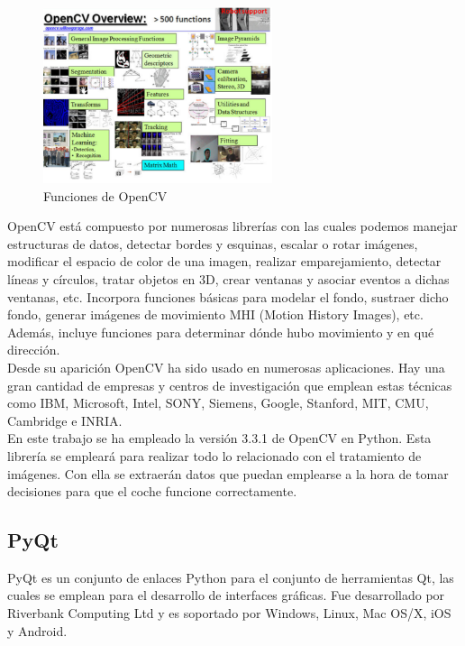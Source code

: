 \begin{figure}[H]
  \begin{center}
    \includegraphics[width=0.6\textwidth]{figures/Estado_arte/opencv.png}
		\caption{Funciones de OpenCV}
		\label{fig.opencv}
		\end{center}
\end{figure}

OpenCV está compuesto por numerosas librerías con las cuales podemos manejar estructuras de datos, detectar bordes y esquinas, escalar o rotar imágenes, modificar el espacio de color de una imagen, realizar emparejamiento, detectar líneas y círculos, tratar objetos en 3D, crear ventanas y asociar eventos a dichas ventanas, etc. Incorpora funciones básicas para modelar el fondo, sustraer dicho fondo, generar imágenes de movimiento MHI (Motion History Images), etc. Además, incluye funciones para determinar dónde hubo movimiento y en qué dirección. \\

Desde su aparición OpenCV ha sido usado en numerosas aplicaciones. Hay una gran cantidad de empresas y centros de investigación que emplean estas técnicas como IBM, Microsoft, Intel, SONY, Siemens, Google, Stanford, MIT, CMU, Cambridge e INRIA.\\

En este trabajo se ha empleado la versión 3.3.1 de OpenCV en Python. Esta librería se empleará para realizar todo lo relacionado con el tratamiento de imágenes. Con ella se extraerán datos que puedan emplearse a la hora de tomar decisiones para que el coche funcione correctamente.


\subsection{PyQt}

PyQt \cite{pyqt} \cite{pyqt1} es un conjunto de enlaces Python para el conjunto de herramientas Qt, las cuales se emplean para el desarrollo de interfaces gráficas. Fue desarrollado por Riverbank Computing Ltd y es soportado por Windows, Linux, Mac OS/X, iOS y Android.\\

